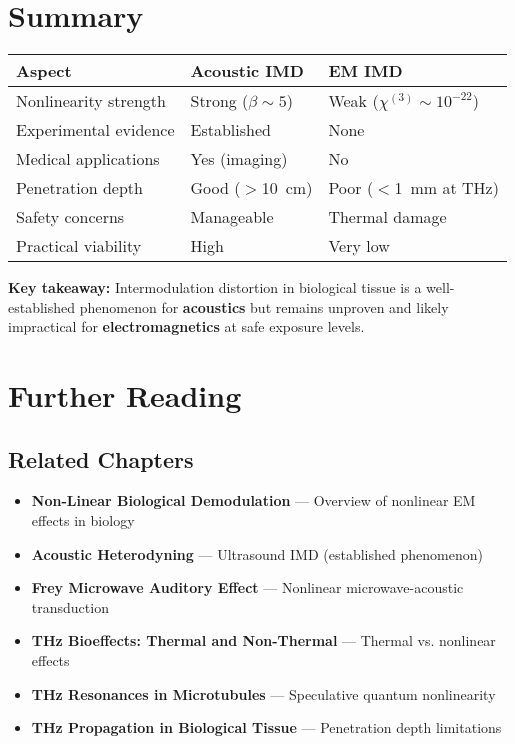 \section{Summary}

\begin{center}
\begin{tabular}{@{}lll@{}}
\toprule
\textbf{Aspect} & \textbf{Acoustic IMD} & \textbf{EM IMD} \\
\midrule
Nonlinearity strength & Strong ($\beta \sim 5$) & Weak ($\chi^{(3)} \sim 10^{-22}$) \\
Experimental evidence & Established & None \\
Medical applications & Yes (imaging) & No \\
Penetration depth & Good ($>$10~cm) & Poor ($<$1~mm at THz) \\
Safety concerns & Manageable & Thermal damage \\
Practical viability & High & Very low \\
\bottomrule
\end{tabular}
\end{center}

\begin{keyconcept}
\textbf{Key takeaway:} Intermodulation distortion in biological tissue is a well-established phenomenon for \textbf{acoustics} but remains unproven and likely impractical for \textbf{electromagnetics} at safe exposure levels.
\end{keyconcept}

\section{Further Reading}

\subsection{Related Chapters}

\begin{itemize}
\item \textbf{Non-Linear Biological Demodulation} --- Overview of nonlinear EM effects in biology
\item \textbf{Acoustic Heterodyning} --- Ultrasound IMD (established phenomenon)
\item \textbf{Frey Microwave Auditory Effect} --- Nonlinear microwave-acoustic transduction
\item \textbf{THz Bioeffects: Thermal and Non-Thermal} --- Thermal vs. nonlinear effects
\item \textbf{THz Resonances in Microtubules} --- Speculative quantum nonlinearity
\item \textbf{THz Propagation in Biological Tissue} --- Penetration depth limitations
\end{itemize}

